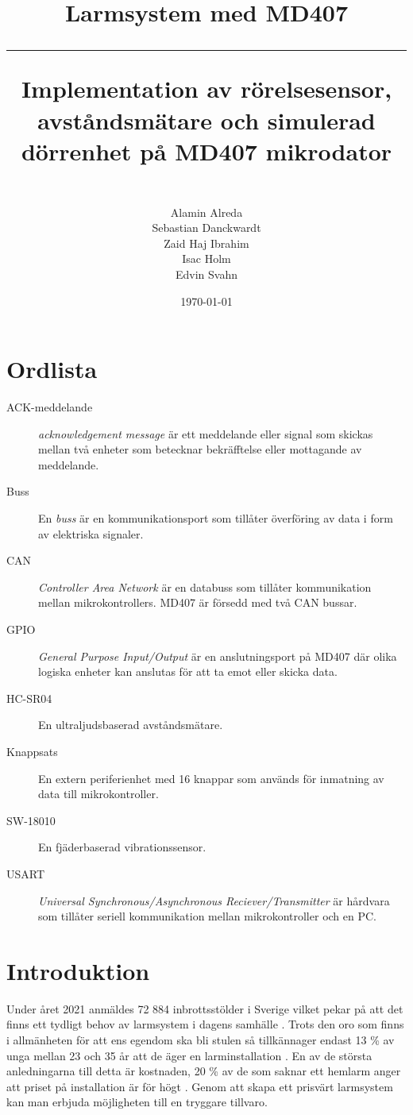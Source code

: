 \documentclass{article}
\title{\textbf{Larmsystem med MD407}\\ 
\hspace{10cm}
\hrule
\hspace{10cm}
Implementation av rörelsesensor, avståndsmätare och simulerad dörrenhet på MD407 mikrodator}
\author{\\Alamin Alreda\\Sebastian Danckwardt\\Zaid Haj Ibrahim\\Isac Holm\\Edvin Svahn}
\date{\today}
\begin{document}
\maketitle
\newpage
\tableofcontents
\newpage
\section*{Ordlista}
\begin{description}

\item[ACK-meddelande] \emph{acknowledgement message} är ett meddelande eller signal som skickas mellan två enheter som betecknar bekräfftelse eller mottagande av meddelande. 
\item[Buss] En \emph{buss} är en kommunikationsport som tillåter överföring av data i form av elektriska signaler.

\item[CAN] \emph{Controller Area Network} är en databuss som tillåter kommunikation mellan mikrokontrollers. MD407 är försedd med två CAN bussar.

\item[GPIO] \emph{General Purpose Input/Output} är en anslutningsport på MD407 där olika logiska enheter kan anslutas för att ta emot eller skicka data.

\item[HC-SR04] En ultraljudsbaserad avståndsmätare.

\item[Knappsats] En extern periferienhet med 16 knappar som används för inmatning av data till mikrokontroller.

\item[SW-18010] En fjäderbaserad vibrationssensor.

\item[USART] \emph{Universal Synchronous/Asynchronous Reciever/Transmitter} är hårdvara som tillåter seriell kommunikation mellan mikrokontroller och en PC.

\end{description}
 \newpage

\setcounter{page}{1}
\section{Introduktion}

Under året 2021 anmäldes 72 884 inbrottsstölder i Sverige vilket pekar på att det finns ett tydligt behov av larmsystem i dagens samhälle \cite{BRa}.
Trots den oro som finns i allmänheten för att ens egendom ska bli stulen så tillkännager endast 13 \% av unga mellan 23 och 35 år att de äger en larminstallation \cite{MoFor}.
En av de största anledningarna till detta är kostnaden, 20 \% av de som saknar ett hemlarm anger att priset på installation är för högt \cite{MoFor}.
Genom att skapa ett prisvärt larmsystem kan man erbjuda möjligheten till en tryggare tillvaro.
\end{document}
